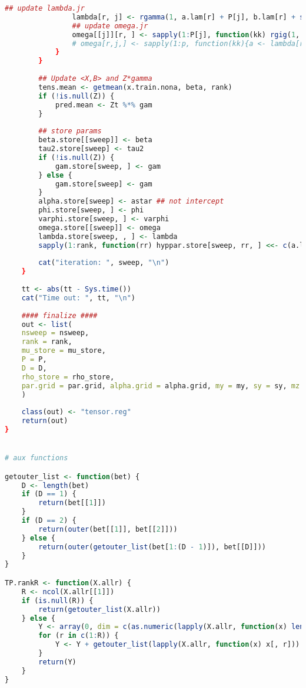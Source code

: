 \documentclass[AutoFakeBold]{LZUThesis}
\begin{document}
\begin{lstlisting}[language=R, caption = {BT-SVM}算法]
				## update lambda.jr
				lambda[r, j] <- rgamma(1, a.lam[r] + P[j], b.lam[r] + sum(abs(beta[[j]][r, ])) / sqrt(tau.r[r]))
				## update omega.jr
				omega[[j]][r, ] <- sapply(1:P[j], function(kk) rgig(1, 1 / 2, beta[[j]][r, kk]^2 / tau.r[r], lambda[r, j]^2))
				# omega[r,j,] <- sapply(1:p, function(kk){a <- lambda[r,j]^2; b <- beta[[r]][kk,j]^2 / tau.r[r]; map <- besselK(sqrt(a*b),0.5 + 1) / besselK(sqrt(a*b), 0.5) * sqrt(b / a); return(map)})
			}
		}
		
		## Update <X,B> and Z*gamma
		tens.mean <- getmean(x.train.nona, beta, rank)
		if (!is.null(Z)) {
			pred.mean <- Zt %*% gam
		}
		
		## store params
		beta.store[[sweep]] <- beta
		tau2.store[sweep] <- tau2
		if (!is.null(Z)) {
			gam.store[sweep, ] <- gam
		} else {
			gam.store[sweep] <- gam
		}
		alpha.store[sweep] <- astar ## not intercept
		phi.store[sweep, ] <- phi
		varphi.store[sweep, ] <- varphi
		omega.store[[sweep]] <- omega
		lambda.store[sweep, , ] <- lambda
		sapply(1:rank, function(rr) hyppar.store[sweep, rr, ] <<- c(a.lam[rr], b.lam[rr]))
		
		cat("iteration: ", sweep, "\n")
	}
	
	tt <- abs(tt - Sys.time())
	cat("Time out: ", tt, "\n")
	
	#### finalize ####
	out <- list(
	nsweep = nsweep,
	rank = rank,
	mu_store = mu_store,
	P = P,
	D = D,
	rho_store = rho_store,
	par.grid = par.grid, alpha.grid = alpha.grid, my = my, sy = sy, mz = mz, sz = sz, mx = mx, sx = sx, Zt = Zt, Xt = Xt, obs = obs, a.t = a.t, b.t = b.t, gam.store = gam.store, alpha.store = alpha.store, beta.store = beta.store, phi.store = phi.store, varphi.store = varphi.store, omega.store = omega.store, lambda.store = lambda.store, hyppar.store = hyppar.store, score.store = score.store, time = tt
	)
	
	class(out) <- "tensor.reg"
	return(out)
}


# aux functions

getouter_list <- function(bet) {
	D <- length(bet)
	if (D == 1) {
		return(bet[[1]])
	}
	if (D == 2) {
		return(outer(bet[[1]], bet[[2]]))
	} else {
		return(outer(getouter_list(bet[1:(D - 1)]), bet[[D]]))
	}
}

TP.rankR <- function(X.allr) {
	R <- ncol(X.allr[[1]])
	if (is.null(R)) {
		return(getouter_list(X.allr))
	} else {
		Y <- array(0, dim = c(as.numeric(lapply(X.allr, function(x) length(x[, 1])))))
		for (r in c(1:R)) {
			Y <- Y + getouter_list(lapply(X.allr, function(x) x[, r]))
		}
		return(Y)
	}
}


\end{lstlisting}
\end{document}
